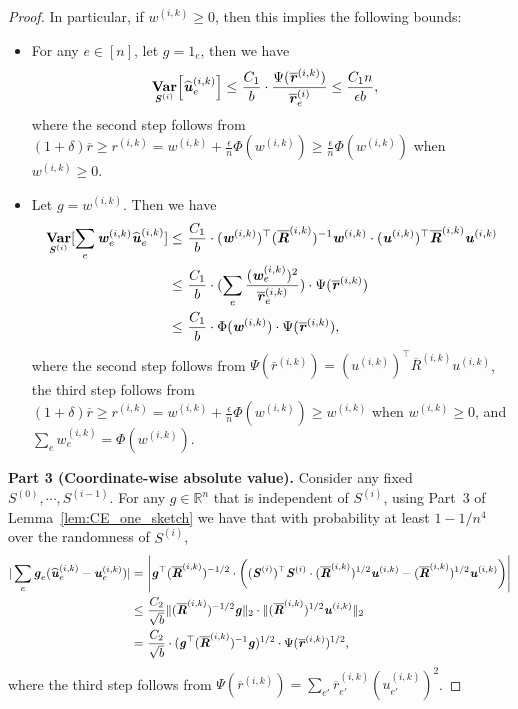 \documentclass[11pt]{article}
\let\originalleft\left
\let\originalright\right
\renewcommand{\left}{\mathopen{}\mathclose\bgroup\originalleft}
\renewcommand{\right}{\aftergroup\egroup\originalright}
\renewcommand\gg{\boldsymbol{\mathit{g}}}
\newcommand\rr{\boldsymbol{\mathit{r}}}
\newcommand\uu{\boldsymbol{\mathit{u}}}
\newcommand\ww{\boldsymbol{\mathit{w}}}
\newcommand\rrbar{\overline{\boldsymbol{\mathit{r}}}}
\renewcommand\SS{\boldsymbol{\mathit{S}}}
\newcommand\RRbar{\boldsymbol{\overline{\mathit{R}}}}
\newcommand{\wh}{\widehat}
\newcommand\R{\mathbb{R}}
\DeclareMathOperator*{\Var}{{\bf {Var}}}
\begin{document}
\begin{proof}
In particular, if $\ww^{(i,k)} \geq 0$, then this implies the following bounds:
\begin{itemize}
\item For any $e \in [n]$, let $\gg = 1_e$, then we have 
\begin{align*}
\Var_{\SS^{(i)}}\left[\wh{\uu}^{(i,k)}_e\right] \leq &~ \frac{C_1}{b} \cdot \frac{\Psi(\rrbar^{(i,k)})}{\rrbar_e^{(i)}} \leq \frac{C_1 n}{\epsilon b},
\end{align*}
where the second step follows from $(1+\delta)\rrbar\geq \rr^{(i,k)} = \ww^{(i,k)} + \frac{\epsilon}{n} \Phi(\ww^{(i,k)}) \geq \frac{\epsilon}{n} \Phi(\ww^{(i,k)})$ when $\ww^{(i,k)} \geq 0$.
\item Let $g = \ww^{(i,k)}$. Then we have
\begin{align*}
\Var_{\SS^{(i)}}[\sum_e \ww^{(i,k)}_e \wh{\uu}^{(i,k)}_e] \leq &~ \frac{C_1}{b} \cdot (\ww^{(i,k)})^{\top} (\RRbar^{(i,k)})^{-1} \ww^{(i,k)} \cdot (\uu^{(i,k)})^{\top} \RRbar^{(i,k)} \uu^{(i,k)} \\
\leq &~ \frac{C_1}{b} \cdot (\sum_e \frac{(\ww^{(i,k)}_e)^2}{\rrbar^{(i,k)}_e}) \cdot \Psi(\rrbar^{(i,k)}) \\
\leq &~ \frac{C_1}{b} \cdot \Phi(\ww^{(i,k)}) \cdot \Psi(\rrbar^{(i,k)}),
\end{align*}
where the second step follows from $\Psi(\rrbar^{(i,k)}) = (\uu^{(i,k)})^{\top} \RRbar^{(i,k)} \uu^{(i,k)}$, the third step follows from $(1+\delta)\rrbar \geq \rr^{(i,k)} = \ww^{(i,k)} + \frac{\epsilon}{n} \Phi(\ww^{(i,k)}) \geq \ww^{(i,k)}$ when $\ww^{(i,k)} \geq 0$, and $\sum_e \ww^{(i,k)}_e = \Phi(\ww^{(i,k)})$.
\end{itemize}

{\bf Part 3 (Coordinate-wise absolute value).} 
Consider any fixed $\SS^{(0)}, \cdots, \SS^{(i-1)}$. For any $\gg \in \R^n$ that is independent of $\SS^{(i)}$, using Part~3 of Lemma~\ref{lem:CE_one_sketch} we have that with probability at least $ 1 - 1/n^4$ over the randomness of $\SS^{(i)}$,
\begin{align*}
|\sum_e \gg_e (\wh{\uu}^{(i,k)}_e - \uu^{(i,k)}_e)| = &~ \left|\gg^{\top} (\RRbar^{(i,k)})^{-1/2}  \cdot \left( (\SS^{(i)})^{\top} \SS^{(i)} \cdot (\RRbar^{(i,k)})^{1/2} \uu^{(i,k)} - (\RRbar^{(i,k)})^{1/2} \uu^{(i,k)} \right)\right| \\
\leq &~ \frac{C_2}{\sqrt{b}} \|(\RRbar^{(i,k)})^{-1/2} \gg\|_2 \cdot \|(\RRbar^{(i,k)})^{1/2} \uu^{(i,k)}\|_2 \\
= &~ \frac{C_2}{\sqrt{b}} \cdot (\gg^{\top} (\RRbar^{(i,k)})^{-1} \gg)^{1/2} \cdot \Psi(\rrbar^{(i,k)})^{1/2},
\end{align*}
where the third step follows from $\Psi(\rrbar^{(i,k)}) = \sum_{e'} \rrbar^{(i,k)}_{e'} (\uu^{(i,k)}_{e'})^2$.


\end{proof}
\end{document}
